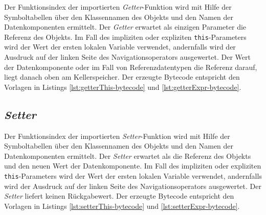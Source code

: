 Der Funktionsindex der importierten \emph{Getter}-Funktion wird mit Hilfe der Symboltabellen über den Klassennamen des Objekts und den Namen der Datenkomponenten ermittelt. Der \emph{Getter} erwartet als einzigen Parameter die Referenz des Objekts. Im Fall des impliziten oder expliziten \lstinline{this}-Parameters wird der Wert der ersten lokalen Variable verwendet, andernfalls wird der Ausdruck auf der linken Seite des Navigationsoperators ausgewertet. Der Wert der Datenkomponente oder im Fall von Referenzdatentypen die Referenz darauf, liegt danach oben am Kellerspeicher. Der erzeugte Bytecode entspricht den Vorlagen in Listings \ref{lst:getterThis-bytecode} und \ref{lst:getterExpr-bytecode}.





\subsection{\emph{Setter}}

Der Funktionsindex der importierten \emph{Setter}-Funktion wird mit Hilfe der Symboltabellen über den Klassennamen des Objekts und den Namen der Datenkomponenten ermittelt. Der \emph{Setter} erwartet als die Referenz des Objekts und den neuen Wert der Datenkomponente. Im Fall des impliziten oder expliziten \lstinline{this}-Parameters wird der Wert der ersten lokalen Variable verwendet, andernfalls wird der Ausdruck auf der linken Seite des Navigationsoperators ausgewertet. Der \emph{Setter} liefert keinen Rückgabewert. Der erzeugte Bytecode entspricht den Vorlagen in Listings \ref{lst:setterThis-bytecode} und \ref{lst:setterExpr-bytecode}.





